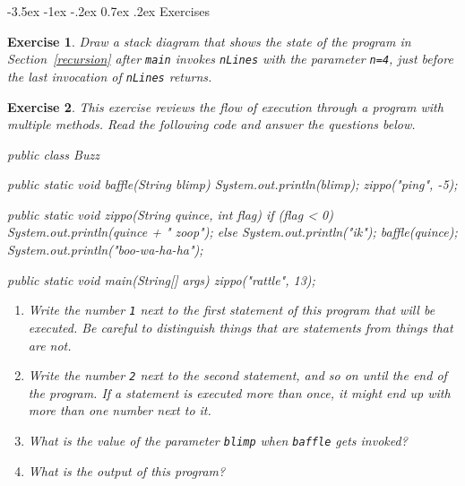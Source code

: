 \documentclass[12pt]{book}
\makeatletter
\renewcommand{\section}{\@startsection {section}{1}{\z@}%
    {-3.5ex \@plus -1ex \@minus -.2ex}%
    {0.7ex \@plus.2ex}%
    {\normalfont\Large\bfseries}}
\theoremstyle{exercise}
\newtheorem{exercise}{Exercise}[chapter]
\makeatother
\begin{document}
\section{Exercises}

\begin{exercise}
Draw a stack diagram that shows the state of the program in Section~\ref{recursion} after {\tt main} invokes {\tt nLines} with the parameter {\tt n=4}, just before the last invocation of {\tt nLines} returns.
\end{exercise}

\begin{exercise}
This exercise reviews the flow of execution through a program with multiple methods.
Read the following code and answer the questions below.

\begin{code}
public class Buzz {

    public static void baffle(String blimp) {
        System.out.println(blimp);
        zippo("ping", -5);
    }

    public static void zippo(String quince, int flag) {
        if (flag < 0) {
            System.out.println(quince + " zoop");
        } else {
            System.out.println("ik");
            baffle(quince);
            System.out.println("boo-wa-ha-ha");
        }
    }

    public static void main(String[] args) {
        zippo("rattle", 13);
    }
}
\end{code}

\begin{enumerate}

\item Write the number {\tt 1} next to the first {\em statement} of this program that will be executed.
Be careful to distinguish things that are statements from things that are not.

\item Write the number {\tt 2} next to the second statement, and so on until the end of the program.
If a statement is executed more than once, it might end up with more than one number next to it.

\item What is the value of the parameter {\tt blimp} when {\tt baffle} gets invoked?

\item What is the output of this program?

\end{enumerate}
\end{exercise}
\end{document}
